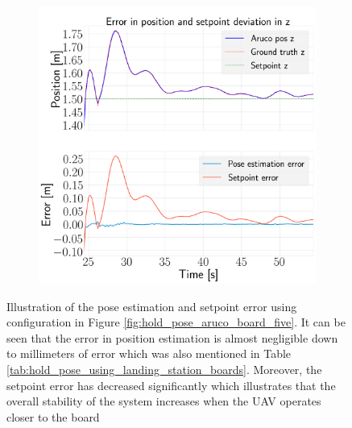 \documentclass[../Head/report.tex]{subfiles}
\begin{document}
\begin{figure}[H]
\begin{subfigure}[t]{.30\textwidth}
        \caption{}
        \label{fig:hold_pose_estimation_test5_y}
    \end{subfigure}
     \hspace{0.2em}
    \begin{subfigure}[t]{.30\textwidth}
        \centering
        \includegraphics[width=\textwidth]{../Figures/hold_pose_using_aruco_pose_estimation/pose_error_z_test1.png}
        \caption{}
        \label{fig:hold_pose_estimation_test5_z}
    \end{subfigure}
    \caption{Illustration of the pose estimation and setpoint error using configuration in Figure \ref{fig:hold_pose_aruco_board_five}. It can be seen that the error in position estimation is almost negligible down to millimeters of error which was also mentioned in Table \ref{tab:hold_pose_using_landing_station_boards}. Moreover, the setpoint error has decreased significantly which illustrates that the overall stability of the system increases when the UAV operates closer to the board}
    \label{fig:hold_pose_estimation_test5_error_pos}
\end{figure}
\end{document}
